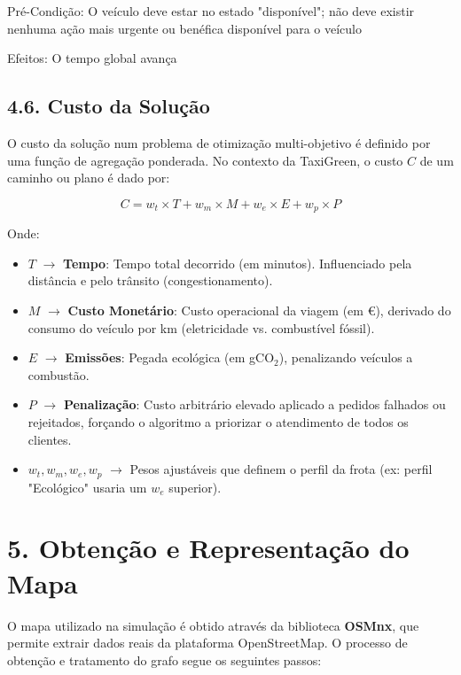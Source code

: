 \documentclass[a4paper]{article}
\begin{document}
\vspace{0.5cm}

\noindent Pré-Condição: O veículo deve estar no estado "disponível"; não deve existir nenhuma ação mais urgente ou benéfica disponível para o veículo

\vspace{0.5cm}

\noindent Efeitos: O tempo global avança

\subsection*{4.6. Custo da Solução}
\noindent O custo da solução num problema de otimização multi-objetivo é definido por uma função de agregação ponderada. No contexto da TaxiGreen, o custo \( C \) de um caminho ou plano é dado por:

\[
C = w_t \times T + w_m \times M + w_e \times E + w_p \times P
\]

\noindent Onde:

\begin{itemize}
    \item \( T \) $\rightarrow$ \textbf{Tempo}: Tempo total decorrido (em minutos). Influenciado pela distância e pelo trânsito (congestionamento).
    \item \( M \) $\rightarrow$ \textbf{Custo Monetário}: Custo operacional da viagem (em €), derivado do consumo do veículo por km (eletricidade vs. combustível fóssil).
    \item \( E \) $\rightarrow$ \textbf{Emissões}: Pegada ecológica (em gCO$_2$), penalizando veículos a combustão.
    \item \( P \) $\rightarrow$ \textbf{Penalização}: Custo arbitrário elevado aplicado a pedidos falhados ou rejeitados, forçando o algoritmo a priorizar o atendimento de todos os clientes.
    \item \( w_t, w_m, w_e, w_p \) $\rightarrow$ Pesos ajustáveis que definem o perfil da frota (ex: perfil "Ecológico" usaria um \( w_e \) superior).
\end{itemize}

\section*{5. Obtenção e Representação do Mapa}
\noindent O mapa utilizado na simulação é obtido através da biblioteca \textbf{OSMnx}, que permite extrair dados reais da plataforma OpenStreetMap.
O processo de obtenção e tratamento do grafo segue os seguintes passos:
\end{document}
